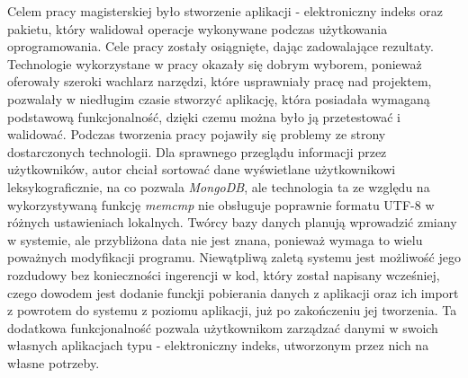 \documentclass{xmgr}
\begin{document}
\summary
\indent \indent \indent Celem pracy magisterskiej było stworzenie aplikacji - elektroniczny indeks oraz pakietu, który walidował operacje wykonywane podczas użytkowania oprogramowania. Cele pracy zostały osiągnięte, dając zadowalające rezultaty.
\newline \newline
Technologie wykorzystane w pracy okazały się dobrym wyborem, ponieważ oferowały szeroki wachlarz narzędzi, które usprawniały pracę nad projektem, pozwalały w niedługim czasie stworzyć aplikację, która posiadała wymaganą podstawową funkcjonalność, dzięki czemu można było ją przetestować i walidować.
\newline \newline
Podczas tworzenia pracy pojawiły się problemy ze strony dostarczonych technologii. Dla sprawnego przeglądu informacji przez użytkowników, autor chciał sortować dane wyświetlane użytkownikowi leksykograficznie, na co pozwala \textit{MongoDB}, ale technologia ta ze względu na wykorzystywaną funkcję \textit{memcmp} nie obsługuje poprawnie formatu UTF-8 w różnych ustawieniach lokalnych. Twórcy bazy danych planują wprowadzić zmiany w systemie, ale przybliżona data nie jest znana, ponieważ wymaga to wielu poważnych modyfikacji programu.
\newline \newline
Niewątpliwą zaletą systemu jest możliwość jego rozdudowy bez konieczności ingerencji w kod, który został napisany wcześniej, czego dowodem jest dodanie funckji pobierania danych z aplikacji oraz ich import z powrotem do systemu z poziomu aplikacji, już po zakończeniu jej tworzenia. Ta dodatkowa funkcjonalność pozwala użytkownikom zarządzać danymi w swoich własnych aplikacjach typu - elektroniczny indeks, utworzonym przez nich na własne potrzeby.







\listoffigures

\oswiadczenie
\end{document}
